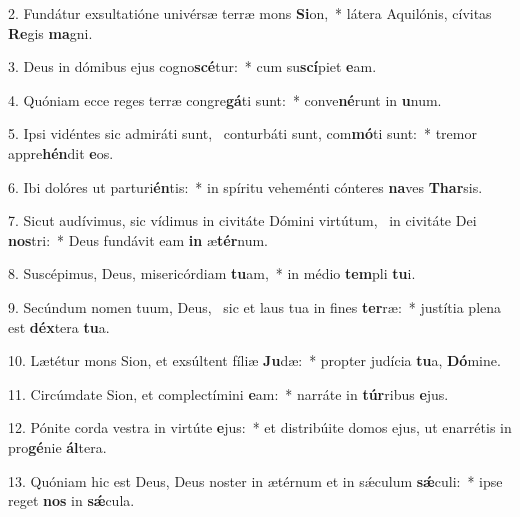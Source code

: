 2. Fundátur exsultatióne univérsæ terræ mons \textbf{Si}on,~*  látera Aquilónis, cívitas \textbf{Re}gis \textbf{ma}gni.\

3. Deus in dómibus ejus cogno\textbf{scé}tur:~*  cum su\textbf{scí}piet \textbf{e}am.\

4. Quóniam ecce reges terræ congre\textbf{gá}ti sunt:~*  conve\textbf{né}runt in \textbf{u}num.\

5. Ipsi vidéntes sic admiráti sunt, \dag\  conturbáti sunt, com\textbf{mó}ti sunt:~*  tremor appre\textbf{hén}dit \textbf{e}os.\

6. Ibi dolóres ut parturi\textbf{én}tis:~*  in spíritu veheménti cónteres \textbf{na}ves \textbf{Thar}sis.\

7. Sicut audívimus, sic vídimus in civitáte Dómini virtútum, \dag\  in civitáte Dei \textbf{nos}tri:~*  Deus fundávit eam \textbf{in} æ\textbf{tér}num.\

8. Suscépimus, Deus, misericórdiam \textbf{tu}am,~*  in médio \textbf{tem}pli \textbf{tu}i.\

9. Secúndum nomen tuum, Deus, \dag\  sic et laus tua in fines \textbf{ter}ræ:~*  justítia plena est \textbf{déx}tera \textbf{tu}a.\

10. Lætétur mons Sion, et exsúltent fíliæ \textbf{Ju}dæ:~*  propter judícia \textbf{tu}a, \textbf{Dó}mine.\

11. Circúmdate Sion, et complectímini \textbf{e}am:~*  narráte in \textbf{túr}ribus \textbf{e}jus.\

12. Pónite corda vestra in virtúte \textbf{e}jus:~*  et distribúite domos ejus, ut enarrétis in pro\textbf{gé}nie \textbf{ál}tera.\

13. Quóniam hic est Deus, Deus noster in ætérnum et in sǽculum \textbf{sǽ}culi:~*  ipse reget \textbf{nos} in \textbf{sǽ}cula.\

